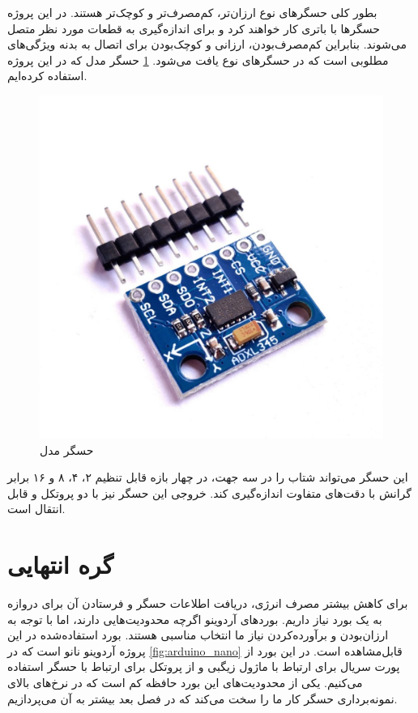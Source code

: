 بطور کلی حسگرهای نوع  ارزان‌تر، کم‌مصرف‌تر و کوچک‌تر هستند. در این پروژه حسگرها با باتری کار خواهند کرد و برای اندازه‌گیری به قطعات مورد نظر متصل می‌شوند. بنابراین کم‌مصرف‌بودن، ارزانی و کوچک‌بودن برای اتصال به بدنه ویژگی‌های مطلوبی است که در حسگرهای نوع  یافت می‌شود. \cref{fig:sensor} حسگر مدل  که در این پروژه استفاده کرده‌ایم.

\begin{figure}[!h]
\centering\includegraphics[scale=0.15]{sensor.png}
\caption{حسگر مدل }\label{fig:sensor}
\end{figure}

این حسگر می‌تواند شتاب را در سه جهت، در چهار بازه قابل تنظیم ۲، ۴، ۸ و ۱۶ برابر گرانش با دقت‌های متفاوت اندازه‌گیری کند. خروجی این حسگر نیز با دو پروتکل  و  قابل انتقال است.

\section{گره انتهایی}

برای کاهش بیشتر مصرف انرژی، دریافت اطلاعات حسگر و فرستادن آن برای دروازه به یک بورد نیاز داریم. بوردهای آردوینو اگرچه محدودیت‌هایی دارند، اما با توجه به ارزان‌بودن و برآورده‌کردن نیاز ما انتخاب مناسبی هستند. بورد استفاده‌شده در این پروژه آردوینو نانو است که در \cref{fig:arduino_nano} قابل‌مشاهده است. در این بورد از پورت سریال برای ارتباط با ماژول زیگبی و از پروتکل  برای ارتباط با حسگر استفاده می‌کنیم. یکی از محدودیت‌های این بورد حافظه کم است که در نرخ‌های بالای نمونه‌برداری حسگر کار ما را سخت می‌کند که در فصل بعد بیشتر به آن می‌پردازیم.

